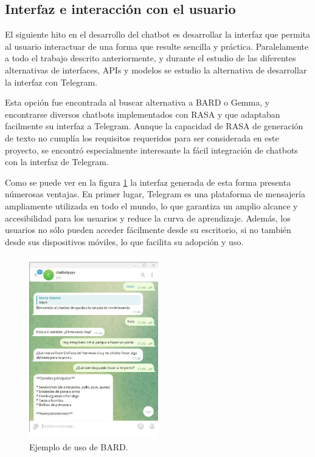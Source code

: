 \subsection{Interfaz e interacción con el usuario}
El siguiente hito en el desarrollo del chatbot es desarrollar la interfaz que permita al usuario interactuar de una forma que resulte sencilla y práctica. Paralelamente a todo el trabajo descrito anteriormente, y durante el estudio de las diferentes alternativas de interfaces, APIs y modelos se estudio la alternativa de desarrollar la interfaz con Telegram. 

Esta opción fue encontrada al buscar alternativa a BARD o Gemma, y encontrarse diversos chatbots implementados con RASA y que adaptaban facilmente su interfaz a Telegram. Aunque la capacidad de RASA de generación de texto no cumplía los requisitos requeridos para ser considerada en este proyecto, se encontró especialmente interesante la fácil integración de chatbots con la interfaz de Telegram. 

Como se puede ver en la figura \ref{fig:ejemploRASATELEGRAM} la interfaz generada de esta forma presenta númerosas ventajas. En primer lugar, Telegram es una plataforma de mensajería ampliamente utilizada en todo el mundo, lo que garantiza un amplio alcance y accesibilidad para los usuarios y reduce la curva de aprendizaje. Además, los usuarios no sólo pueden acceder fácilmente desde su escritorio, si no también desde sus dispositivos móviles, lo que facilita su adopción y uso.

\begin{figure}
	\centering
	\includegraphics[width=0.5\textwidth]{Imagenes/telegram1}
	\caption{ Ejemplo de uso de BARD.}
	\label{fig:ejemploRASATELEGRAM}
\end{figure}

